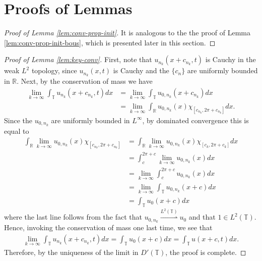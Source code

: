 \documentclass[12pt,reqno]{amsart}
\numberwithin{equation}{section}  %
\newcommand{\rr}{\mathbb{R}}
\newcommand{\ci}{\mathbb{T}}
\begin{document}
\section{Proofs of Lemmas}
%
%
%
%
\begin{proof}[Proof of Lemma \ref{lem:conv-prop-init}]
  It is analogous to the the proof of Lemma \ref{lem:conv-prop-init-bous}, which
  is presented later in this section.
\end{proof}
%
%
%
\begin{proof}[Proof of Lemma \ref{lem:key-conv}]
First, note that $u_{n_{k}}(x + c_{n_{k}}, t)$
is Cauchy in the weak
$L^{2}$ topology, since  $u_{n_{k}}(x ,t)$ is Cauchy
and the $\{c_{n} \}$ are uniformly bounded in $\rr$. 
Next, by the conservation of mass we have 
%
%
%
%
\begin{equation*}
\begin{split}
  \lim_{k \to \infty} \int_{\ci} u_{n_{k}}(x + c_{n_{k}}, t) dx 
  & = \lim_{k \to \infty} \int_{\ci}
  u_{0,n_{k}}(x + c_{n_{k}}) dx
  \\
  & = \lim_{k \to \infty}\int_{\rr} u_{0,n_{k}}(x) \chi_{[c_{n_{k}}, 2 \pi +
  c_{n_{k}}]} dx.
\end{split}
\end{equation*}
%
%
Since the $u_{0,n_{k}}$ are uniformly bounded in $L^{\infty}$, by dominated
convergence this is equal to
%
%
\begin{equation*}
\begin{split}
  \int_{\rr} \lim_{k \to \infty} u_{0,n_{k}}(x) \chi_{[c_{n_{k}}, 2 \pi + c_{n_{k}}]}
  & = \int_{\rr} \lim_{k \to \infty} u_{0,n_{k}}(x) \chi_{[c_{k}, 2 \pi  +
  c_{k}]} dx
  \\
  & = \int_{c}^{2 \pi + c} \lim_{k \to \infty} u_{0,n_{k}}(x) dx
  \\
  & = \lim_{k \to \infty} \int_{c}^{2 \pi + c}  u_{0,n_{k}}(x) dx
  \\
  & = \lim_{k \to \infty} \int_{\ci} u_{0,n_{k}}(x+c) dx
  \\
  & = \int_{\ci} u_{0}(x +c) dx
\end{split}
\end{equation*}
where the last line follows from the fact that $u_{0,n_{k}}
\overset{L^{2}(\ci)}{\rightharpoonup} u_{0}$ and that $1 \in L^{2}(\ci)$.
Hence, invoking the conservation of mass one last time, we see that
%
%
\begin{equation*}
\begin{split}
  \lim_{k \to \infty} \int_{\ci} u_{n_{k}}(x + c_{n_{k}}, t) dx = \int_{\ci}
  u_{0}(x +c) dx = \int_{\ci} u(x +c, t) dx.
\end{split}
\end{equation*}
%
%
Therefore, by the uniqueness of the limit in $D'(\ci)$, the proof is complete. 
%
%
%
\end{proof}
\end{document}
